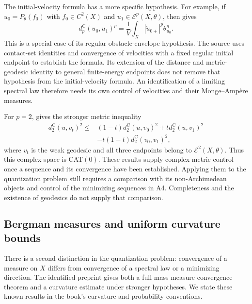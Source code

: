 The initial-velocity formula has a more specific hypothesis.
For example, if $u_0=P_\theta(f_0)$ with $f_0\in C^2(X)$ and
$u_1\in\mathcal E^p(X,\theta)$, then
\cite[Lemma~5.3]{Gupta24GeodesicV1} gives
\[
 d_p^{\mathrm C}(u_0,u_1)^p
   =\frac1V\int_X|\dot u_{0+}|^p\theta_{u_0}^n.
\]
This is a special case of its regular obstacle-envelope hypothesis.
The source uses contact-set identities and convergence of velocities
with a fixed regular initial endpoint to establish the formula.
Its extension of the distance and metric-geodesic identity to general
finite-energy endpoints does not remove that hypothesis from the
initial-velocity formula. An identification of a limiting spectral
law therefore needs its own control of velocities and their
Monge--Amp\`ere measures.

For $p=2$, \cite[Theorem~8.3]{Gupta24GeodesicV1} gives the stronger
metric inequality
\[
 \begin{split}
 d_2^{\mathrm C}(u,v_t)^2\leq{}&
 (1-t)d_2^{\mathrm C}(u,v_0)^2+t d_2^{\mathrm C}(u,v_1)^2\\
 &-t(1-t)d_2^{\mathrm C}(v_0,v_1)^2,
 \end{split}
\]
where $v_t$ is the weak geodesic and all three endpoints belong to
$\mathcal E^2(X,\theta)$. Thus this complex space is CAT$(0)$.
These results supply complex metric control once a sequence and
its convergence have been established. Applying them to the
quantization problem still requires a comparison with its
non-Archimedean objects and control of the minimizing sequences
in A4. Completeness and the existence of geodesics do not supply
that comparison.

\subsection{Bergman measures and uniform curvature bounds}
\label{sec:ytd-bergman-measure-curvature}

There is a second distinction in the quantization problem: convergence
of a measure on $X$ differs from convergence of a spectral law or a
minimizing direction. The identified preprint
\cite{BlockiDarvas26Radon} gives both a full-mass measure convergence
theorem and a curvature estimate under stronger hypotheses. We state
these known results in the book's curvature and probability conventions.

